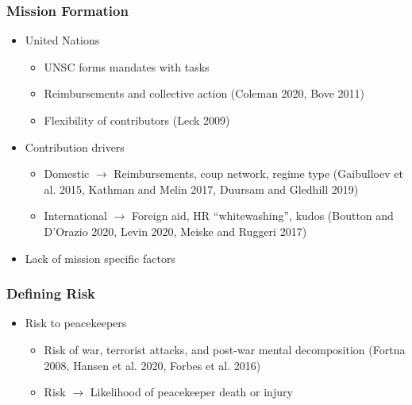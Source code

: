 \documentclass{beamer}
\begin{document}
\begin{frame}
\frametitle{Mission Formation}

\begin{itemize}
  \item United Nations
  \begin{itemize}
    \pause
    \item UNSC forms mandates with tasks
    \pause
    \item Reimbursements and collective action {\tiny (Coleman 2020, Bove 2011)}
    \pause
    \item Flexibility of contributors {\tiny (Leck 2009)}
    \pause
  \end{itemize}
  \item Contribution drivers
  \begin{itemize}
    \pause
    \item Domestic $\rightarrow$ Reimbursements, coup network, regime type {\tiny (Gaibulloev et al. 2015, Kathman and Melin 2017, Duursam and Gledhill 2019)}
    \pause
    \item International $\rightarrow$ Foreign aid, HR ``whitewashing'', kudos {\tiny(Boutton and D'Orazio 2020, Levin 2020, Meiske and Ruggeri 2017)}
  \end{itemize}
  \pause
  \item Lack of mission specific factors
\end{itemize}

\end{frame}



\begin{frame}
\frametitle{Defining Risk}

\begin{itemize}
  \item{Risk to peacekeepers}
  \pause
  \begin{itemize}
    \item Risk of war, terrorist attacks, and post-war mental decomposition {\tiny(Fortna 2008, Hansen et al. 2020, Forbes et al. 2016)}
    \pause
    \item Risk $\rightarrow$ Likelihood of peacekeeper death or injury
  \end{itemize}
\end{itemize}

\end{frame}

\end{document}
